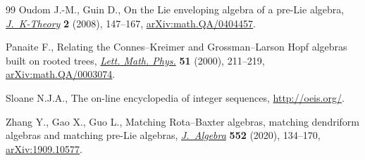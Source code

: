 \documentclass[pdftex]{sigma}
\numberwithin{equation}{section}
\begin{document}
\begin{thebibliography}{99}
Oudom J.-M., Guin D., On the {L}ie enveloping algebra of a pre-{L}ie algebra,
 \href{https://doi.org/10.1017/is008001011jkt037}{\textit{J.~K-Theory}} \textbf{2} (2008), 147--167, \href{https://arxiv.org/abs/math.QA/0404457}{arXiv:math.QA/0404457}.

Panaite F., Relating the {C}onnes--{K}reimer and {G}rossman--{L}arson {H}opf
 algebras built on rooted trees, \href{https://doi.org/10.1023/A:1007600216187}{\textit{Lett. Math. Phys.}} \textbf{51}
 (2000), 211--219, \href{https://arxiv.org/abs/math.QA/0003074}{arXiv:math.QA/0003074}.

Sloane N.J.A., The on-line encyclopedia of integer sequences,
 \url{http://oeis.org/}.

Zhang Y., Gao X., Guo L., Matching {R}ota--{B}axter algebras, matching
 dendriform algebras and matching pre-{L}ie algebras, \href{https://doi.org/10.1016/j.jalgebra.2020.02.011}{\textit{J.~Algebra}}
 \textbf{552} (2020), 134--170, \href{https://arxiv.org/abs/1909.10577}{arXiv:1909.10577}.

\end{thebibliography}\LastPageEnding
\end{document}
